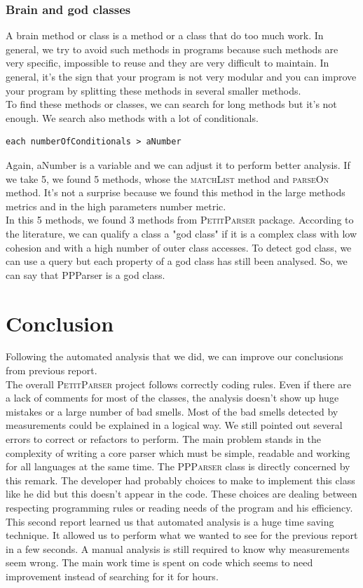 \subsubsection{Brain and god classes}
A brain method or class is a method or a class that do too much work.  In general, we try to avoid such methods in programs because such methods are very specific, impossible to reuse and they are very difficult to maintain. In general, it's the sign that your program is not very modular and you can improve your program by splitting these methods in several smaller methods.\\
To find these methods or classes, we can search for long methods but it's not enough.  We search also methods with a lot of conditionals.
\begin{lstlisting}
each numberOfConditionals > aNumber
\end{lstlisting}
Again, aNumber is a variable and we can adjust it to perform better analysis.  If we take 5, we found 5 methods, whose the \textsc{matchList} method and \textsc{parseOn} method.  It's not a surprise because we found this method in the large methods metrics and in the high parameters number metric.\\
In this 5 methods, we found 3 methods from \textsc{PetitParser} package. According to the literature, we can qualify a class a "god class" if it is a complex class with low cohesion and with a high number of outer class accesses.
To detect god class, we can use a query but each property of a god class has still been analysed.  So, we can say that PPParser is a god class.
\section{Conclusion}
Following the automated analysis that we did, we can improve our conclusions from previous report. \\
The overall \textsc{PetitParser} project follows correctly coding rules. Even if there are a lack of comments for most of the classes, the analysis doesn't show up huge mistakes or a large number of bad smells. Most of the bad smells detected by measurements could be explained in a logical way. We still pointed out several errors to correct or refactors to perform. The main problem stands in the complexity of writing a core parser which must be simple, readable and working for all languages at the same time. The \textsc{PPParser} class is directly concerned by this remark. The developer had probably choices to make to implement this class like he did but this doesn't appear in the code. These choices are dealing between respecting programming rules or reading needs of the program and his efficiency. \\
This second report learned us that automated analysis is a huge time saving technique. It allowed us to perform what we wanted to see for the previous report in a few seconds. A manual analysis is still required to know why measurements seem wrong. The main work time is spent on code which seems to need improvement instead of searching for it for hours. 


